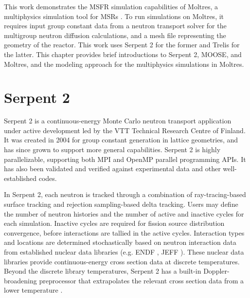 This work demonstrates the \gls{MSFR} simulation capabilities of Moltres, a
multiphysics simulation tool for \glspl{MSR} \cite{lindsay_introduction_2018}.
To run simulations on Moltres, it requires input
group constant data from a neutron transport solver for the
multigroup neutron diffusion calculations, and a mesh file representing the
geometry of the reactor. This work uses Serpent 2 \cite{leppanen_serpent_2014}
for the former and Trelis \cite{noauthor_trelis_2018} for the latter.
This chapter provides brief introductions to
Serpent 2, \gls{MOOSE}, and Moltres, and the modeling approach for the
multiphysics simulations in Moltres.

\section{Serpent 2}

Serpent 2 \cite{leppanen_serpent_2014} is a continuous-energy Monte Carlo
neutron transport application under
active development led by the VTT Technical Research Centre of Finland. It was
created in 2004 for group constant generation in lattice geometries, and has
since grown to support more general capabilities. Serpent 2 is highly
parallelizable, supporting
both MPI and OpenMP parallel programming APIs. It has also been validated and
verified against experimental data and other well-established codes.

In Serpent 2, each neutron is tracked through a combination of
ray-tracing-based surface tracking and rejection sampling-based delta
tracking. Users may define the number of neutron histories and the number of
active and inactive cycles for each
simulation. Inactive cycles are required for fission source distribution
convergence, before interactions are tallied in the active cycles.
Interaction types and locations are
determined stochastically based on neutron interaction data from established
nuclear data libraries (e.g. ENDF \cite{chadwick_endf/b-vii.1_2011}, JEFF
\cite{oecd/nea_jeff-3.1.2_2014}). These nuclear data libraries provide
continuous-energy cross section data at discrete temperatures. Beyond the
discrete library temperatures, Serpent 2 has a built-in Doppler-broadening
preprocessor that extrapolates the relevant cross section data from a lower
temperature \cite{leppanen_serpent_2014}. 

